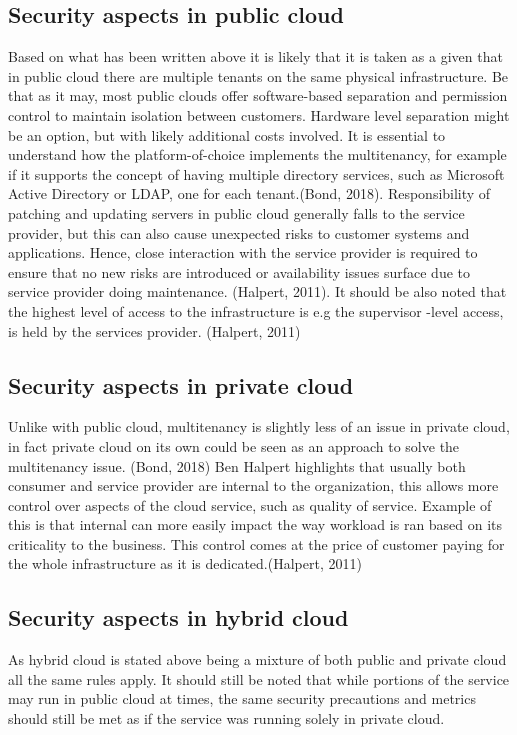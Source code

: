 \documentclass{article}
\begin{document}
\subsection{Security aspects in public cloud}
Based on what has been written above it is likely that it is taken as a given that in public cloud there are multiple tenants on the same physical infrastructure.
Be that as it may, most public clouds offer software-based separation and permission control to maintain isolation between customers. Hardware level separation might be an option, but with likely additional costs involved. It is essential to understand how the platform-of-choice implements the multitenancy, for example if it supports the concept of having multiple directory services, such as Microsoft Active Directory or LDAP, one for each tenant.(Bond, 2018).
Responsibility of patching and updating servers in public cloud generally falls to the service provider, but this can also cause unexpected risks to customer systems and applications. Hence, close interaction with the service provider is required to ensure that no new risks are introduced  or availability issues surface due to service provider doing maintenance. (Halpert, 2011).
It should be also noted that the highest level of access to the infrastructure is e.g the supervisor -level access, is held by the services provider. (Halpert, 2011)
\subsection{Security aspects in private cloud}
Unlike with public cloud, multitenancy is slightly less of an issue in private cloud, in fact private cloud on its own could be seen as an approach to solve the multitenancy issue. (Bond, 2018)
Ben Halpert highlights that usually both consumer and service provider are internal to the organization, this allows more control over aspects of the cloud service, such as quality of service.
Example of this is that internal can more easily impact the way workload is ran based on its criticality to the business. This control comes at the price of customer paying for the whole infrastructure as it is dedicated.(Halpert, 2011) 
\subsection{Security aspects in hybrid cloud}
As hybrid cloud is stated above being a mixture of both public and private cloud all the same rules apply. It should still be noted that while portions of the service may run in public cloud at times, the same security precautions and metrics should still be met as if the service was running solely in private cloud.
\end{document}
